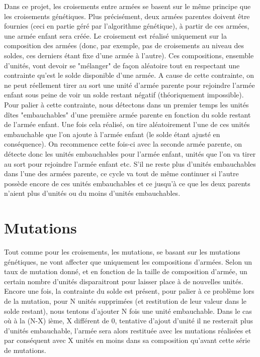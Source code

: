 \documentclass{article}
\begin{document}
	Dans ce projet, les croisements entre armées se basent sur le même principe que les croisements génétiques. Plus précisément, deux armées parentes doivent être fournies (ceci en partie géré par l'algorithme génétique), à partir de ces armées, une armée enfant sera créée. Le croisement est réalisé uniquement sur la composition des armées (donc, par exemple, pas de croisements au niveau des soldes, ces derniers étant fixe d'une armée à l'autre). Ces compositions, ensemble d'unités, vont devoir se "mélanger" de façon aléatoire tout en respectant une contrainte qu'est le solde disponible d'une armée. A cause de cette contrainte, on ne peut réellement tirer au sort une unité d'armée parente pour rejoindre l'armée enfant sous peine de voir un solde restant négatif (théoriquement impossible). Pour palier à cette contrainte, nous détectons dans un premier temps les unités dîtes "embauchables" d'une première armée parente en fonction du solde restant de l'armée enfant. Une fois cela réalisé, on tire aléatoirement l'une de ces unités embauchable que l'on ajoute à l'armée enfant (le solde étant ajusté en conséquence). On recommence cette fois-ci avec la seconde armée parente, on détecte donc les unités embauchables pour l'armée enfant, unités que l'on va tirer au sort pour rejoindre l'armée enfant etc. S'il ne reste plus d'unités embauchables dans l'une des armées parente, ce cycle va tout de même continuer si l'autre possède encore de ces unités embauchables et ce jusqu'à ce que les deux parents n'aient plus d'unités ou du moins d'unités embauchables.
	
	
\section{Mutations}

	Tout comme pour les croisements, les mutations, se basant sur les mutations génétiques, ne vont affecter que uniquement les compositions d'armées. Selon un taux de mutation donné, et en fonction de la taille de composition d'armée, un certain nombre d'unités disparaitront pour laisser place à de nouvelles unités. Encore une fois, la contrainte du solde est présent, pour palier à ce problème lors de la mutation, pour N unités supprimées (et restitution de leur valeur dans le solde restant), nous tentons d'ajouter N fois une unité embauchable. Dans le cas où à la (N-X) ième, X différent de 0, tentative d'ajout d'unité il ne resterait plus d'unités embauchable, l'armée sera alors restituée avec les mutations réalisées et par conséquent avec X unités en moins dans sa composition qu'avant cette série de mutations.
\newpage
\end{document}
